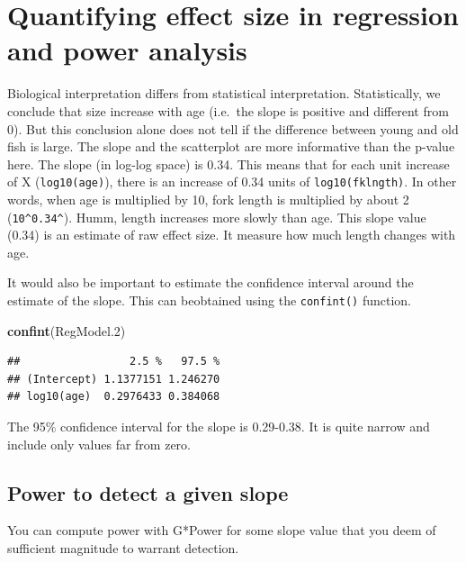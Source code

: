 \documentclass[
  12pt,
]{book}
\newenvironment{Shaded}{\begin{snugshade}}{\end{snugshade}}
\newcommand{\FloatTok}[1]{\textcolor[rgb]{0.00,0.00,0.81}{#1}}
\newcommand{\KeywordTok}[1]{\textcolor[rgb]{0.13,0.29,0.53}{\textbf{#1}}}
\newcommand{\NormalTok}[1]{#1}
\begin{document}
\hypertarget{quantifying-effect-size-in-regression-and-power-analysis}{%
\section{Quantifying effect size in regression and power analysis}\label{quantifying-effect-size-in-regression-and-power-analysis}}

Biological interpretation differs from statistical interpretation. Statistically, we conclude that size increase with age (i.e.~the slope is positive and different from 0). But this conclusion alone does not tell if the difference between young and old fish is large. The slope and the scatterplot are more informative than the p-value here. The slope (in log-log space) is 0.34.
This means that for each unit increase of X (\texttt{log10(age)}), there is an increase of 0.34 units of \texttt{log10(fklngth)}. In other words, when age is multiplied by 10, fork length is multiplied by about 2 (\texttt{10\^{}0.34\^{}}). Humm, length increases more slowly than age. This slope value (0.34) is an estimate of raw effect size. It measure how much length changes with age.

It would also be important to estimate the confidence interval around the estimate of the slope. This can beobtained using the \texttt{confint()} function.

\begin{Shaded}
\begin{Highlighting}[]
\KeywordTok{confint}\NormalTok{(RegModel}\FloatTok{.2}\NormalTok{)}
\end{Highlighting}
\end{Shaded}

\begin{verbatim}
##                 2.5 %   97.5 %
## (Intercept) 1.1377151 1.246270
## log10(age)  0.2976433 0.384068
\end{verbatim}

The 95\% confidence interval for the slope is 0.29-0.38. It is quite narrow and include only values far from zero.

\hypertarget{power-to-detect-a-given-slope}{%
\subsection{Power to detect a given slope}\label{power-to-detect-a-given-slope}}

You can compute power with G*Power for some slope value that you deem of sufficient magnitude to warrant detection.
\end{document}
